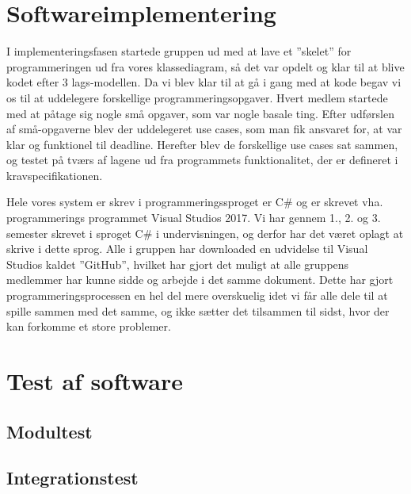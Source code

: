 \section{Softwareimplementering}
I implementeringsfasen startede gruppen ud med at lave et ”skelet” for programmeringen ud fra vores klassediagram, så det var opdelt og klar til at blive kodet efter 3 lags-modellen. Da vi blev klar til at gå i gang med at kode begav vi os til at uddelegere forskellige programmeringsopgaver. Hvert medlem startede med at påtage sig nogle små opgaver, som var nogle basale ting. Efter udførslen af små-opgaverne blev der uddelegeret use cases, som man fik ansvaret for, at var klar og funktionel til deadline. Herefter blev de forskellige use cases sat sammen, og testet på tværs af lagene ud fra programmets funktionalitet, der er defineret i kravspecifikationen. 

Hele vores system er skrev i programmeringssproget er C\# og er skrevet vha. programmerings programmet Visual Studios 2017.  Vi har gennem 1., 2. og 3. semester skrevet i sproget C\# i undervisningen, og derfor har det været oplagt at skrive i dette sprog. Alle i gruppen har downloaded en udvidelse til Visual Studios kaldet ”GitHub”, hvilket har gjort det muligt at alle gruppens medlemmer har kunne sidde og arbejde i det samme dokument. Dette har gjort programmeringsprocessen en hel del mere overskuelig idet vi får alle dele til at spille sammen med det samme, og ikke sætter det tilsammen til sidst, hvor der kan forkomme et store problemer.
\section{Test af software}
\subsection{Modultest}
\subsection{Integrationstest}
